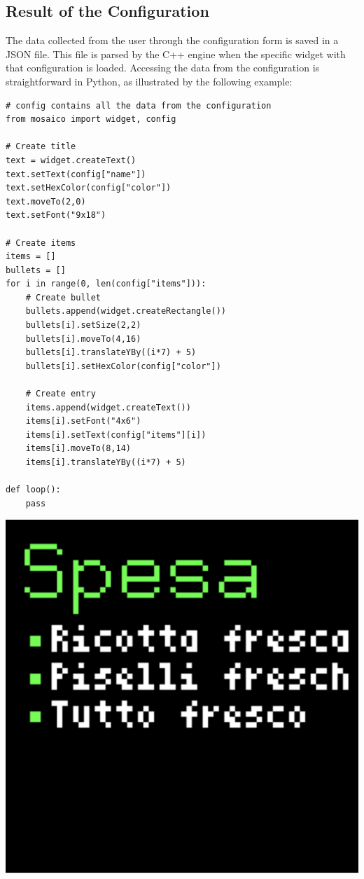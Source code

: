 \subsection{Result of the Configuration}
The data collected from the user through the configuration form is saved in a JSON file. 
This file is parsed by the C++ engine when the specific widget with that configuration is loaded. 
Accessing the data from the configuration is straightforward in Python, as illustrated by the following example:

\begin{minipage}{0.65\textwidth}
\begin{verbatim}
# config contains all the data from the configuration
from mosaico import widget, config

# Create title
text = widget.createText()
text.setText(config["name"])
text.setHexColor(config["color"])
text.moveTo(2,0)
text.setFont("9x18")

# Create items
items = []
bullets = []
for i in range(0, len(config["items"])):
    # Create bullet
    bullets.append(widget.createRectangle())
    bullets[i].setSize(2,2)        
    bullets[i].moveTo(4,16)
    bullets[i].translateYBy((i*7) + 5)    
    bullets[i].setHexColor(config["color"])  
    
    # Create entry  
    items.append(widget.createText())
    items[i].setFont("4x6")
    items[i].setText(config["items"][i])
    items[i].moveTo(8,14)    
    items[i].translateYBy((i*7) + 5)

def loop():
    pass
\end{verbatim}
\end{minipage}
\begin{minipage}{0.30\textwidth}
\centering
\includegraphics[width=\textwidth]{tesi/img/config_form/shopping_list_result.png}
\end{minipage}

